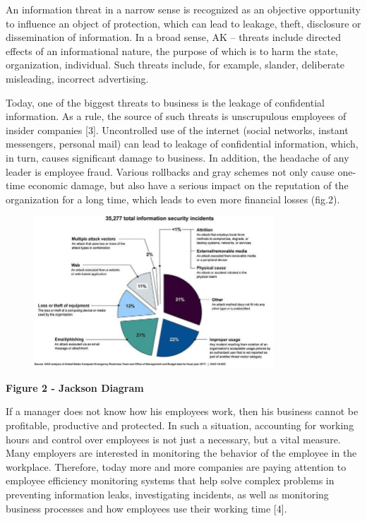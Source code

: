 An information threat in a narrow sense is recognized as an objective
opportunity to influence an object of protection, which can lead to
leakage, theft, disclosure or dissemination of information. In a broad
sense, AK -- threats include directed effects of an informational
nature, the purpose of which is to harm the state, organization,
individual. Such threats include, for example, slander, deliberate
misleading, incorrect advertising.

Today, one of the biggest threats to business is the leakage of
confidential information. As a rule, the source of such threats is
unscrupulous employees of insider companies {[}3{]}. Uncontrolled use of
the internet (social networks, instant messengers, personal mail) can
lead to leakage of confidential information, which, in turn, causes
significant damage to business. In addition, the headache of any leader
is employee fraud. Various rollbacks and gray schemes not only cause
one-time economic damage, but also have a serious impact on the
reputation of the organization for a long time, which leads to even more
financial losses (fig.2).

\begin{figure}[H]
	\centering
	\includegraphics[width=0.8\textwidth]{assets/64}
	\caption*{}
\end{figure}

\textbf{Figure 2 - Jackson Diagram}

If a manager does not know how his employees work, then his business
cannot be profitable, productive and protected. In such a situation,
accounting for working hours and control over employees is not just a
necessary, but a vital measure. Many employers are interested in
monitoring the behavior of the employee in the workplace. Therefore,
today more and more companies are paying attention to employee
efficiency monitoring systems that help solve complex problems in
preventing information leaks, investigating incidents, as well as
monitoring business processes and how employees use their working time
{[}4{]}.

